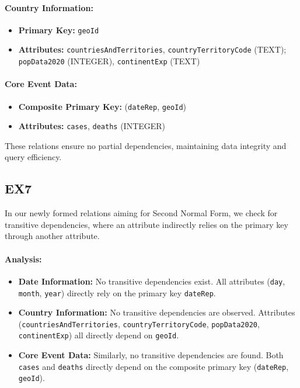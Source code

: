 \documentclass[10pt]{article}
\begin{document}
\paragraph{Country Information:}
\begin{itemize}
    \item \textbf{Primary Key:} \texttt{geoId}
    \item \textbf{Attributes:} \texttt{countriesAndTerritories}, \texttt{countryTerritoryCode} (TEXT); \texttt{popData2020} (INTEGER), \texttt{continentExp} (TEXT)
\end{itemize}

\paragraph{Core Event Data:}
\begin{itemize}
    \item \textbf{Composite Primary Key:} (\texttt{dateRep}, \texttt{geoId})
    \item \textbf{Attributes:} \texttt{cases}, \texttt{deaths} (INTEGER)
\end{itemize}

These relations ensure no partial dependencies, maintaining data integrity and query efficiency.

\subsection{EX7}
In our newly formed relations aiming for Second Normal Form, we check for transitive dependencies, where an attribute indirectly relies on the primary key through another attribute.

\paragraph{Analysis:}
\begin{itemize}
    \item \textbf{Date Information:} No transitive dependencies exist. All attributes (\texttt{day}, \texttt{month}, \texttt{year}) directly rely on the primary key \texttt{dateRep}.
    \item \textbf{Country Information:} No transitive dependencies are observed. Attributes (\texttt{countriesAndTerritories}, \texttt{countryTerritoryCode}, \texttt{popData2020}, \texttt{continentExp}) all directly depend on \texttt{geoId}.
    \item \textbf{Core Event Data:} Similarly, no transitive dependencies are found. Both \texttt{cases} and \texttt{deaths} directly depend on the composite primary key (\texttt{dateRep}, \texttt{geoId}).
\end{itemize}
\end{document}
